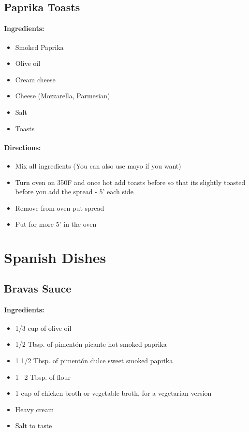 \documentclass{article}
\begin{document}
\subsection{Paprika Toasts}

\paragraph{Ingredients:}

\begin{itemize}
	\item Smoked Paprika
	\item Olive oil
	\item Cream cheese
	\item Cheese (Mozzarella, Parmesian)
	\item Salt
	\item Toasts
\end{itemize}

\paragraph{Directions:}
\begin{itemize}
	\item Mix all ingredients (You can also use mayo if you want)
	\item Turn oven on 350F and once hot add toasts before so that its slightly toasted before you add the spread - 5' each side
	\item Remove from oven put spread
	\item Put for more 5' in the oven
\end{itemize}


\section{Spanish Dishes}


\subsection{Bravas Sauce}

\paragraph{Ingredients:}

\begin{itemize}
	\item 1/3 cup of olive oil
	\item 1/2 Tbsp. of pimentón picante hot smoked paprika
	\item 1 1/2 Tbsp. of pimentón dulce sweet smoked paprika
	\item 1 –2 Tbsp. of flour
	\item 1 cup of chicken broth or vegetable broth, for a vegetarian version
	\item Heavy cream
	\item Salt to taste
\end{itemize}
\end{document}
